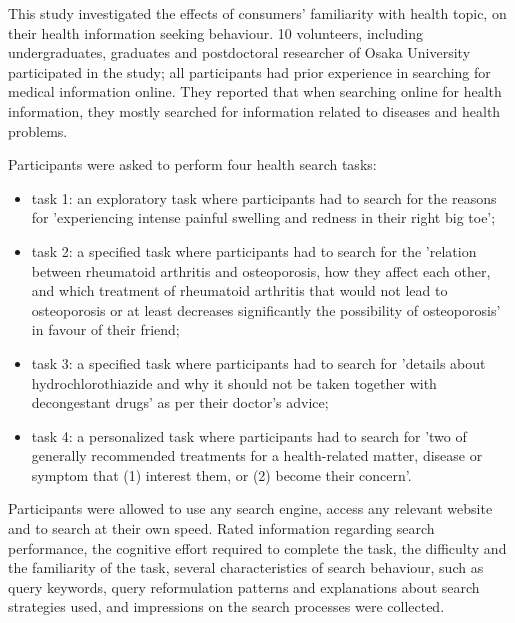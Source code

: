 \documentclass[]{article}
\begin{document}
This study investigated the effects of consumers' familiarity with health topic, on their health information seeking behaviour. 10 volunteers, including undergraduates, graduates and postdoctoral researcher of Osaka University participated in the study; all participants had prior experience in searching for medical information online. They reported that when searching online for health information, they mostly searched for information related to diseases and health problems.

Participants were asked to perform four health search tasks: 
\begin{itemize}
	\item task 1: an exploratory task where participants had to search for the reasons for 'experiencing intense painful swelling and redness in their right big toe';
	
	\item task 2: a specified task where participants had to search for the 'relation between rheumatoid arthritis and osteoporosis, how they affect each other, and which treatment of rheumatoid arthritis that would not lead to osteoporosis or at least decreases significantly the possibility of osteoporosis' in favour of their friend;
	
	\item task 3: a specified task where participants had to search for 'details about  hydrochlorothiazide and why it should not be taken together with decongestant drugs' as per their doctor's advice;
	
	\item task 4: a personalized task where participants had to search for 'two of generally recommended treatments for a health-related matter, disease or symptom that (1) interest them, or (2) become their concern'.
\end{itemize}

Participants were allowed to use any search engine, access any relevant website and to search at their own speed. Rated information regarding search performance, the cognitive effort required to complete the task, the difficulty and the familiarity of the task, several characteristics of search behaviour, such as query keywords, query reformulation patterns and explanations about search strategies used, and impressions on the search processes were collected. 
\end{document}
